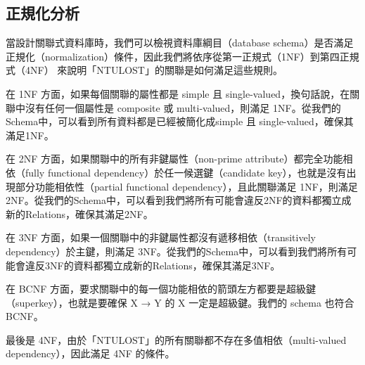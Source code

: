 \documentclass[12pt,a4paper]{article}
\begin{document}
\begin{table}[H]
    \centering
    \caption{資料表 FEEDBACK 的欄位資訊}
    \label{tab:fb}
\end{table}






\subsection{正規化分析}

當設計關聯式資料庫時，我們可以檢視資料庫綱目（database schema）是否滿足正規化（normalization）條件，因此我們將依序從第一正規式（1NF）到第四正規式（4NF） 來說明「NTULOST」的關聯是如何滿足這些規則。

在 1NF 方面，如果每個關聯的屬性都是 simple 且 single-valued，換句話說，在關聯中沒有任何一個屬性是 composite 或 multi-valued，則滿足 1NF。從我們的Schema中，可以看到所有資料都是已經被簡化成simple 且 single-valued，確保其滿足1NF。

在 2NF 方面，如果關聯中的所有非鍵屬性（non-prime attribute）都完全功能相依（fully functional dependency）於任一候選鍵（candidate key），也就是沒有出現部分功能相依性（partial functional dependency），且此關聯滿足 1NF，則滿足 2NF。從我們的Schema中，可以看到我們將所有可能會違反2NF的資料都獨立成新的Relations，確保其滿足2NF。

在 3NF 方面，如果一個關聯中的非鍵屬性都沒有遞移相依（transitively dependency）於主鍵，則滿足 3NF。從我們的Schema中，可以看到我們將所有可能會違反3NF的資料都獨立成新的Relations，確保其滿足3NF。

在 BCNF 方面，要求關聯中的每一個功能相依的箭頭左方都要是超級鍵（superkey），也就是要確保 X → Y 的 X 一定是超級鍵。我們的 schema 也符合 BCNF。 

最後是 4NF，由於「NTULOST」的所有關聯都不存在多值相依（multi-valued dependency），因此滿足 4NF 的條件。 
\end{document}
